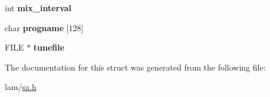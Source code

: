 \begin{DoxyCompactItemize}
\item 
\hypertarget{structSAType_a6278b4f187628b7d7b02925210c2e956}{
int {\bfseries mix\_\-interval}}
\label{structSAType_a6278b4f187628b7d7b02925210c2e956}

\item 
\hypertarget{structSAType_a63342a6a8396add971d56c1ff5d5d977}{
char {\bfseries progname} \mbox{[}128\mbox{]}}
\label{structSAType_a63342a6a8396add971d56c1ff5d5d977}

\item 
\hypertarget{structSAType_a86565dd3239fa3784a71cb81e16fb16c}{
FILE $\ast$ {\bfseries tunefile}}
\label{structSAType_a86565dd3239fa3784a71cb81e16fb16c}

\end{DoxyCompactItemize}


The documentation for this struct was generated from the following file:\begin{DoxyCompactItemize}
\item 
lam/\hyperlink{sa_8h}{sa.h}\end{DoxyCompactItemize}
